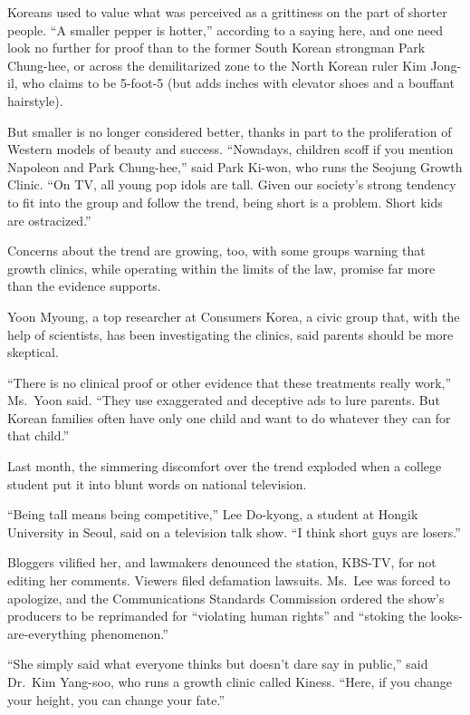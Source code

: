 ﻿\documentclass[12pt]{article}
\begin{document}
Koreans used to value what was perceived as a grittiness on the part of shorter people. ``A smaller
pepper is hotter,'' according to a saying here, and one need look no further for proof than to the
former South Korean strongman Park Chung-hee, or across the demilitarized zone to the North Korean
ruler Kim Jong-il, who claims to be 5-foot-5 (but adds inches with elevator shoes and a bouffant
hairstyle).

But smaller is no longer considered better, thanks in part to the proliferation of Western models of
beauty and success. ``Nowadays, children scoff if you mention Napoleon and Park Chung-hee,'' said
Park Ki-won, who runs the Seojung Growth Clinic. ``On TV, all young pop idols are tall. Given our
society's strong tendency to fit into the group and follow the trend, being short is a problem.
Short kids are ostracized.''

Concerns about the trend are growing, too, with some groups warning that growth clinics, while
operating within the limits of the law, promise far more than the evidence supports.

Yoon Myoung, a top researcher at Consumers Korea, a civic group that, with the help of scientists,
has been investigating the clinics, said parents should be more skeptical.

``There is no clinical proof or other evidence that these treatments really work,'' Ms.~Yoon said.
``They use exaggerated and deceptive ads to lure parents. But Korean families often have only one
child and want to do whatever they can for that child.''

Last month, the simmering discomfort over the trend exploded when a college student put it into
blunt words on national television.

``Being tall means being competitive,'' Lee Do-kyong, a student at Hongik University in Seoul, said
on a television talk show. ``I think short guys are losers.''

Bloggers vilified her, and lawmakers denounced the station, KBS-TV, for not editing her comments.
Viewers filed defamation lawsuits. Ms.~Lee was forced to apologize, and the Communications Standards
Commission ordered the show's producers to be reprimanded for ``violating human rights'' and
``stoking the looks-are-everything phenomenon.''

``She simply said what everyone thinks but doesn't dare say in public,'' said Dr.~Kim Yang-soo, who
runs a growth clinic called Kiness. ``Here, if you change your height, you can change your fate.''
\end{document}
